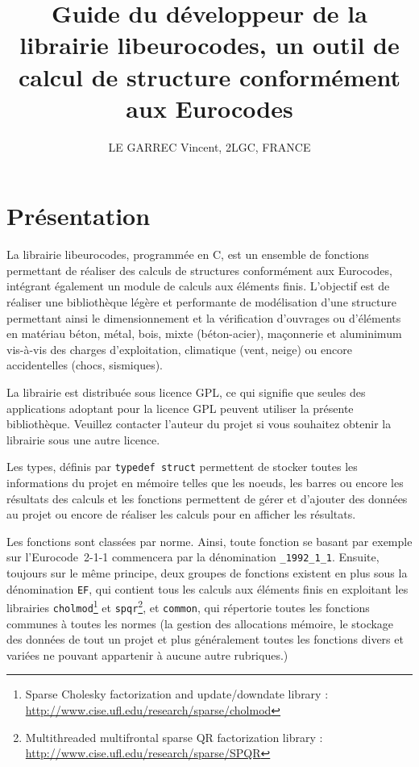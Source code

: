 \documentclass{article}
\begin{document}
\author{LE GARREC Vincent, 2LGC, FRANCE}
\title{Guide du développeur de la librairie libeurocodes, un outil de calcul de structure conformément aux Eurocodes}
\maketitle
\newpage
\section{Présentation}
La librairie libeurocodes, programmée en C, est un ensemble de fonctions permettant de réaliser des calculs de structures conformément aux Eurocodes, intégrant également un module de calculs aux éléments finis. L'objectif est de réaliser une bibliothèque légère et performante de modélisation d'une structure permettant ainsi le dimensionnement et la vérification d'ouvrages ou d'éléments en matériau béton, métal, bois, mixte (béton-acier), maçonnerie et aluminimum vis-à-vis des charges d'exploitation, climatique (vent, neige) ou encore accidentelles (chocs, sismiques).
\par
La librairie est distribuée sous licence GPL, ce qui signifie que seules des applications adoptant pour la licence GPL peuvent utiliser la présente bibliothèque. Veuillez contacter l'auteur du projet si vous souhaitez obtenir la librairie sous une autre licence.
\par
\par
Les types, définis par {\texttt{typedef struct}} permettent de stocker toutes les informations du projet en mémoire telles que les noeuds, les barres ou encore les résultats des calculs et les fonctions permettent de gérer et d'ajouter des données au projet ou encore de réaliser les calculs pour en afficher les résultats.
\par
Les fonctions sont classées par norme. Ainsi, toute fonction se basant par exemple sur l'Eurocode~2-1-1 commencera par la dénomination {\texttt{\_1992\_1\_1}}. Ensuite, toujours sur le même principe, deux groupes de fonctions existent en plus sous la dénomination {\texttt{EF}}, qui contient tous les calculs aux éléments finis en exploitant les librairies {\texttt{cholmod}}\footnote{Sparse Cholesky factorization and update/downdate library : \url{http://www.cise.ufl.edu/research/sparse/cholmod}} et {\texttt{spqr}}\footnote{Multithreaded multifrontal sparse QR factorization library : \url{http://www.cise.ufl.edu/research/sparse/SPQR}}, et {\texttt{common}}, qui répertorie toutes les fonctions communes à toutes les normes (la gestion des allocations mémoire, le stockage des données de tout un projet et plus généralement toutes les fonctions divers et variées ne pouvant appartenir à aucune autre rubriques.)
\newpage
\end{document}
